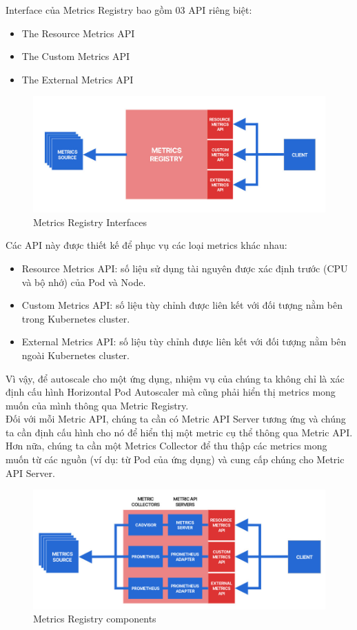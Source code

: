 Interface của Metrics Registry bao gồm 03 API riêng biệt:
\begin{itemize}
    \item The Resource Metrics API
    \item The Custom Metrics API
    \item The External Metrics API
\end{itemize}
\begin{figure}[H]
  \begin{center}
    \includegraphics[scale=0.75]{images/phat/metrics_registry_API.jpg}
    \caption{Metrics Registry Interfaces}
  \end{center}
\end{figure}
Các API này được thiết kế để phục vụ các loại metrics khác nhau:
\begin{itemize}
    \item Resource Metrics API: số liệu sử dụng tài nguyên được xác định trước (CPU và bộ nhớ) của Pod và Node.
    \item Custom Metrics API: số liệu tùy chỉnh được liên kết với đối tượng nằm bên trong Kubernetes cluster.
    \item External Metrics API: số liệu tùy chỉnh được liên kết với đối tượng nằm bên ngoài Kubernetes cluster.
\end{itemize}
Vì vậy, để autoscale cho một ứng dụng, nhiệm vụ của chúng ta không chỉ là xác định cấu hình Horizontal Pod Autoscaler mà cũng phải hiển thị metrics mong muốn của mình thông qua Metric Registry.\\[0.5cm]
Đối với mỗi Metric API, chúng ta cần có Metric API Server tương ứng và chúng ta cần định cấu hình cho nó để hiển thị một metric cụ thể thông qua Metric API.\\[0.5cm]
Hơn nữa, chúng ta cần một Metrics Collector để thu thập các metrics mong muốn từ các nguồn (ví dụ: từ Pod của ứng dụng) và cung cấp chúng cho Metric API Server.
\begin{figure}[H]
  \begin{center}
    \includegraphics[scale=0.80]{images/phat/metric_registry_detail.jpg}
    \caption{Metrics Registry components}
  \end{center}
\end{figure}
